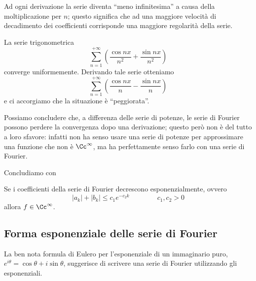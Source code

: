 Ad ogni derivazione la serie diventa ``meno infinitesima'' a causa della moltiplicazione per $n$; questo significa che ad una maggiore velocità di decadimento dei coefficienti corrisponde una maggiore regolarità della serie.

\begin{exa}
La serie trigonometrica
$$
\sum_{n=1}^{+\infty}\left(\frac{\cos nx}{n^2}+\frac{\sin nx}{n^2}\right)
$$
converge uniformemente. Derivando tale serie otteniamo
$$
\sum_{n=1}^{+\infty}\left(\frac{\cos nx}{n}-\frac{\sin nx}{n}\right)
$$
e ci accorgiamo che la situazione è ``peggiorata''.
\end{exa}
Possiamo concludere che, a differenza delle serie di potenze, le serie di Fourier possono perdere la convergenza dopo una derivazione; questo però non è del tutto a loro sfavore: infatti non ha senso usare una serie di potenze per approssimare una funzione che non è $\Cc^{\infty}$, ma ha perfettamente senso farlo con una serie di Fourier.

Concludiamo con 
\begin{thm}
Se i coefficienti della serie di Fourier decrescono esponenzialmente, ovvero 
$$
|a_k|+|b_k|\leq c_1e^{-c_2k} \qquad \qquad c_1,c_2>0
$$
allora $f\in\Cc^\infty$.
\end{thm}

\subsection{Forma esponenziale delle serie di Fourier}

La ben nota formula di Eulero per l'esponenziale di un immaginario puro, $e^{i\theta}=\cos\theta+i\sin\theta$, suggerisce di scrivere una serie di Fourier utilizzando gli esponenziali.

